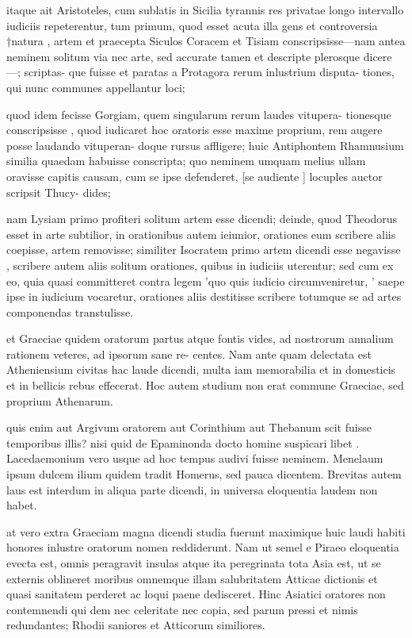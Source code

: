  itaque ait Aristoteles, cum sublatis in Sicilia tyrannis res privatae longo intervallo iudiciis repeterentur, tum primum, quod esset acuta illa gens et controversia †natura , artem et praecepta Siculos Coracem et Tisiam conscripsisse—nam antea neminem solitum via nec arte, sed accurate tamen et descripte plerosque dicere—; scriptas- que fuisse et paratas a Protagora rerum inlustrium disputa- tiones, qui nunc communes appellantur loci;

 quod idem fecisse Gorgiam, quem singularum rerum laudes vitupera- tionesque conscripsisse , quod iudicaret hoc oratoris esse maxime proprium, rem augere posse laudando vituperan- doque rursus affligere; huic Antiphontem Rhamnusium similia quaedam habuisse conscripta; quo neminem umquam melius ullam oravisse capitis causam, cum se ipse defenderet, [se audiente ] locuples auctor scripsit Thucy- dides;

 nam Lysiam primo profiteri solitum artem esse dicendi; deinde, quod Theodorus esset in arte subtilior, in orationibus autem ieiunior, orationes eum scribere aliis coepisse, artem removisse; similiter Isocratem primo artem dicendi esse negavisse , scribere autem aliis solitum orationes, quibus in iudiciis uterentur; sed cum ex eo, quia quasi committeret contra legem 'quo quis iudicio circumveniretur, ' saepe ipse in iudicium vocaretur, orationes aliis destitisse scribere totumque se ad artes componendas transtulisse.

 et Graeciae quidem oratorum partus atque fontis vides, ad nostrorum annalium rationem veteres, ad ipsorum sane re- centes. Nam ante quam delectata est Atheniensium civitas hac laude dicendi, multa iam memorabilia et in domesticis et in bellicis rebus effecerat. Hoc autem studium non erat commune Graeciae, sed proprium Athenarum.

 quis enim aut Argivum oratorem aut Corinthium aut Thebanum scit fuisse temporibus illis? nisi quid de Epaminonda docto homine suspicari libet . Lacedaemonium vero usque ad hoc tempus audivi fuisse neminem. Menelaum ipsum dulcem ilium quidem tradit Homerus, sed pauca dicentem. Brevitas autem laus est interdum in aliqua parte dicendi, in universa eloquentia laudem non habet.

 at vero extra Graeciam magna dicendi studia fuerunt maximique huic laudi habiti honores inlustre oratorum nomen reddiderunt. Nam ut semel e Piraeo eloquentia evecta est, omnis peragravit insulas atque ita peregrinata tota Asia est, ut se externis oblineret moribus omnemque illam salubritatem Atticae dictionis et quasi sanitatem perderet ac loqui paene dedisceret. Hinc Asiatici oratores non contemnendi qui dem nec celeritate nec copia, sed parum pressi et nimis redundantes; Rhodii saniores et Atticorum similiores.

